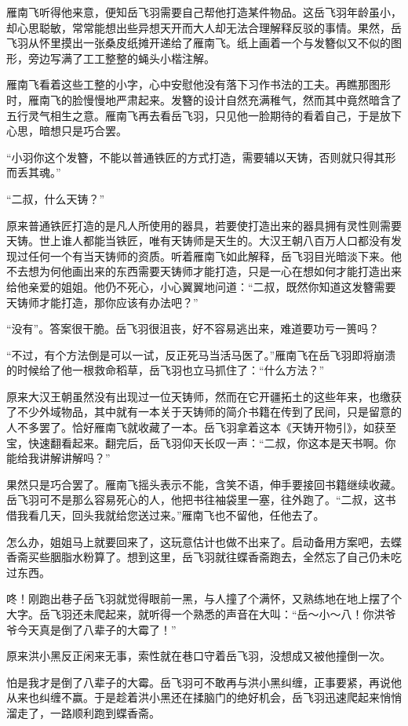雁南飞听得他来意，便知岳飞羽需要自己帮他打造某件物品。这岳飞羽年龄虽小，却心思聪敏，常常能想出些异想天开而大人却无法合理解释反驳的事情。果然，岳飞羽从怀里摸出一张桑皮纸摊开递给了雁南飞。纸上画着一个与发簪似又不似的图形，旁边写满了工工整整的蝇头小楷注解。

雁南飞看着这些工整的小字，心中安慰他没有落下习作书法的工夫。再瞧那图形时，雁南飞的脸慢慢地严肃起来。发簪的设计自然充满稚气，然而其中竟然暗含了五行灵气相生之意。雁南飞再去看岳飞羽，只见他一脸期待的看着自己，于是放下心思，暗想只是巧合罢。

“小羽你这个发簪，不能以普通铁匠的方式打造，需要辅以天铸，否则就只得其形而丢其魂。”

“二叔，什么天铸？”

原来普通铁匠打造的是凡人所使用的器具，若要使打造出来的器具拥有灵性则需要天铸。世上谁人都能当铁匠，唯有天铸师是天生的。大汉王朝八百万人口都没有发现过任何一个有当天铸师的资质。听着雁南飞如此解释，岳飞羽目光暗淡下来。他不去想为何他画出来的东西需要天铸师才能打造，只是一心在想如何才能打造出来给他亲爱的姐姐。他仍不死心，小心翼翼地问道：“二叔，既然你知道这发簪需要天铸师才能打造，那你应该有办法吧？”

“没有”。答案很干脆。岳飞羽很沮丧，好不容易逃出来，难道要功亏一篑吗？

“不过，有个方法倒是可以一试，反正死马当活马医了。”雁南飞在岳飞羽即将崩溃的时候给了他一根救命稻草，岳飞羽也立马抓住了：“什么方法？”

原来大汉王朝虽然没有出现过一位天铸师，然而在它开疆拓土的这些年来，也缴获了不少外域物品，其中就有一本关于天铸师的简介书籍在传到了民间，只是留意的人不多罢了。恰好雁南飞就收藏了一本。岳飞羽拿着这本《天铸开物引》，如获至宝，快速翻看起来。翻完后，岳飞羽仰天长叹一声：“二叔，你这本是天书啊。你能给我讲解讲解吗？”

果然只是巧合罢了。雁南飞摇头表示不能，含笑不语，伸手要接回书籍继续收藏。岳飞羽可不是那么容易死心的人，他把书往袖袋里一塞，往外跑了。“二叔，这书借我看几天，回头我就给您送过来。”雁南飞也不留他，任他去了。

怎么办，姐姐马上就要回来了，这玩意估计也做不出来了。启动备用方案吧，去蝶香斋买些胭脂水粉算了。想到这里，岳飞羽就往蝶香斋跑去，全然忘了自己仍未吃过东西。

咚！刚跑出巷子岳飞羽就觉得眼前一黑，与人撞了个满怀，又熟练地在地上摆了个大字。岳飞羽还未爬起来，就听得一个熟悉的声音在大叫：“岳～小～八！你洪爷爷今天真是倒了八辈子的大霉了！”

原来洪小黑反正闲来无事，索性就在巷口守着岳飞羽，没想成又被他撞倒一次。

怕是我才是倒了八辈子的大霉。岳飞羽可不敢再与洪小黑纠缠，正事要紧，再说他从来也纠缠不赢。于是趁着洪小黑还在揉脑门的绝好机会，岳飞羽迅速爬起来悄悄溜走了，一路顺利跑到蝶香斋。

